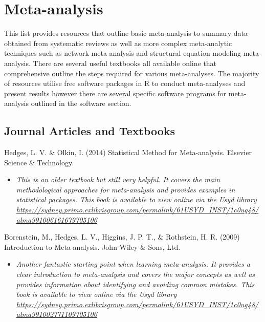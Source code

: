 \documentclass[
]{book}
\providecommand{\tightlist}{%
  \setlength{\itemsep}{0pt}\setlength{\parskip}{0pt}}
\begin{document}
\hypertarget{meta-analysis}{%
\chapter{Meta-analysis}\label{meta-analysis}}

This list provides resources that outline basic meta-analysis to summary data obtained from systematic reviews as well as more complex meta-analytic techniques such as network meta-analysis and structural equation modeling meta-analysis. There are several useful textbooks all available online that comprehensive outline the steps required for various meta-analyses. The majority of resources utilise free software packages in R to conduct meta-analyses and present results however there are several specific software programs for meta-analysis outlined in the software section.

\hypertarget{journal-articles-and-textbooks-4}{%
\section{Journal Articles and Textbooks}\label{journal-articles-and-textbooks-4}}

Hedges, L. V. \& Olkin, I. (2014) Statistical Method for Meta-analysis. Elsevier Science \& Technology.

\begin{itemize}
\tightlist
\item
  \emph{This is an older textbook but still very helpful. It covers the main methodological approaches for meta-analysis and provides examples in statistical packages. This book is available to view online via the Usyd library \url{https://sydney.primo.exlibrisgroup.com/permalink/61USYD_INST/1c0ug48/alma991006161679705106} }
\end{itemize}

Borenstein, M., Hedges, L. V., Higgins, J. P. T., \& Rothstein, H. R. (2009) Introduction to Meta-analysis. John Wiley \& Sons, Ltd.~

\begin{itemize}
\tightlist
\item
  \emph{Another fantastic starting point when learning meta-analysis. It provides a clear introduction to meta-analysis and covers the major concepts as well as provides information about identifying and avoiding common mistakes. This book is available to view online via the Usyd library \url{https://sydney.primo.exlibrisgroup.com/permalink/61USYD_INST/1c0ug48/alma991002771109705106} }
\end{itemize}
\end{document}
